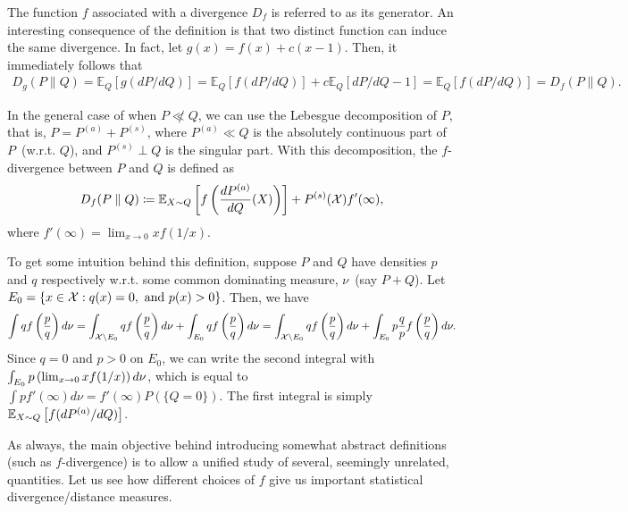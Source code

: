 \documentclass[12pt]{article}
\begin{document}
\begin{remark}
	\label{remark:non-uniqueness-of-f-div-generator} 
	The function $f$ associated with a divergence $D_f$ is referred to as its {generator}. An interesting consequence of the definition is that two distinct function can induce the same divergence. In fact, let $g(x) = f(x) + c(x-1)$. Then, it immediately follows that 
	\begin{align}
	D_g(P \parallel Q) = \mathbb{E}_Q[g(dP/dQ)] = \mathbb{E}_Q[f(dP/dQ)] + c \mathbb{E}_Q[dP/dQ - 1] = \mathbb{E}_Q[f(dP/dQ)] = D_f(P \parallel Q). 
	\end{align}
\end{remark}
\begin{remark}
    \label{remark:non-singular-extension} In the general case of when $P \not \ll Q$, we can use the Lebesgue decomposition of $P$, that is, $P = P^{(a)} + P^{(s)}$,  where $P^{(a)} \ll Q$ is the absolutely continuous part of $P$~(w.r.t. $Q$), and $P^{(s)} \perp Q$ is the singular part. 
    With this decomposition, the $f$-divergence between $P$ and $Q$ is defined as 
    \begin{align}
        D_f(P \parallel Q) \coloneqq \mathbb{E}_{X \sim Q} \left[ f \left( \frac{dP^{(a)}}{dQ}(X) \right) \right] + P^{(s)}({\cal X})f'(\infty), 
    \end{align}
    where $f'(\infty) = \lim_{x \to 0} x f(1/x)$. 

    To get some intuition behind this definition, suppose $P$ and $Q$ have densities $p$ and $q$ respectively w.r.t. some common dominating measure, $\nu$~(say $P+Q$). Let $E_0 = \{x \in {\cal X}: q(x) = 0, \text{ and } p(x)>0\}$. Then, we have 
    \begin{align}
    \int q f\left( \frac{p}{q} \right) d\nu = \int_{{\cal X} \setminus E_0}q f\left( \frac{p}{q} \right) d\nu + \int_{E_0} q f\left( \frac{p}{q} \right) d\nu = \int_{{\cal X} \setminus E_0}q f\left( \frac{p}{q} \right) d\nu + \int_{E_0}  p \frac q  p f\left( \frac{p}{q} \right) d\nu. 
    \end{align}
    Since $q=0$ and $p>0$ on $E_0$, we can write the second integral with $\int_{E_0} p \left( \lim_{x \to 0} x f(1/x) \right) d\nu$, which is equal to $\int p f'(\infty) d \nu = f'(\infty) P(\{Q=0\})$. The first integral is simply $\mathbb{E}_{X \sim Q}\left[ f(dP^{(a)}/dQ) \right]$.  
\end{remark}

As always, the main objective behind introducing somewhat abstract definitions (such as $f$-divergence) is to allow a unified study of several, seemingly unrelated, quantities. Let us see how different choices of $f$ give us important statistical divergence/distance measures.
\end{document}
